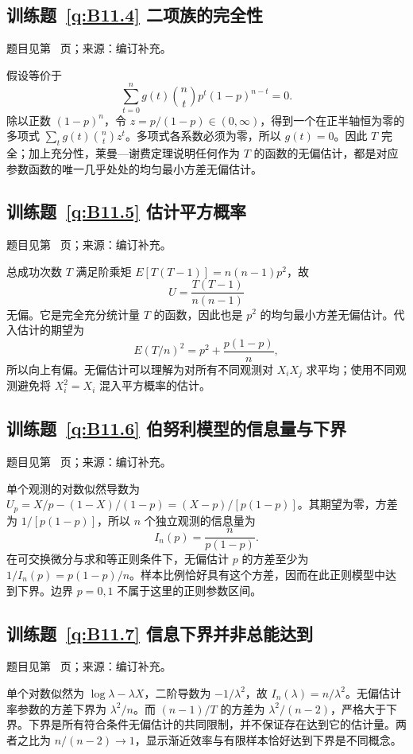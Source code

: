 \subsection*{训练题~\ref{q:B11.4} 二项族的完全性}\label{a:B11.4}{\small 题目见第~\pageref{q:B11.4} 页；来源：编订补充。}
\begin{solve}假设等价于\[\sum_{t=0}^ng(t)\binom nt p^t(1-p)^{n-t}=0.\]除以正数 $(1-p)^n$，令 $z=p/(1-p)\in(0,\infty)$，得到一个在正半轴恒为零的多项式 $\sum_tg(t)\binom ntz^t$。多项式各系数必须为零，所以 $g(t)=0$。因此 $T$ 完全；加上充分性，莱曼—谢费定理说明任何作为 $T$ 的函数的无偏估计，都是对应参数函数的唯一几乎处处的均匀最小方差无偏估计。\end{solve}

\subsection*{训练题~\ref{q:B11.5} 估计平方概率}\label{a:B11.5}{\small 题目见第~\pageref{q:B11.5} 页；来源：编订补充。}
\begin{solve}总成功次数 $T$ 满足阶乘矩 $E[T(T-1)]=n(n-1)p^2$，故\[U=\frac{T(T-1)}{n(n-1)}\]无偏。它是完全充分统计量 $T$ 的函数，因此也是 $p^2$ 的均匀最小方差无偏估计。代入估计的期望为\[E(T/n)^2=p^2+\frac{p(1-p)}n,\]所以向上有偏。无偏估计可以理解为对所有不同观测对 $X_iX_j$ 求平均；使用不同观测避免将 $X_i^2=X_i$ 混入平方概率的估计。\end{solve}

\subsection*{训练题~\ref{q:B11.6} 伯努利模型的信息量与下界}\label{a:B11.6}{\small 题目见第~\pageref{q:B11.6} 页；来源：编订补充。}
\begin{solve}单个观测的对数似然导数为 $U_p=X/p-(1-X)/(1-p)=(X-p)/[p(1-p)]$。其期望为零，方差为 $1/[p(1-p)]$，所以 $n$ 个独立观测的信息量为\[I_n(p)=\frac{n}{p(1-p)}.\]在可交换微分与求和等正则条件下，无偏估计 $p$ 的方差至少为 $1/I_n(p)=p(1-p)/n$。样本比例恰好具有这个方差，因而在此正则模型中达到下界。边界 $p=0,1$ 不属于这里的正则参数区间。\end{solve}

\subsection*{训练题~\ref{q:B11.7} 信息下界并非总能达到}\label{a:B11.7}{\small 题目见第~\pageref{q:B11.7} 页；来源：编订补充。}
\begin{solve}单个对数似然为 $\log\lambda-\lambda X$，二阶导数为 $-1/\lambda^2$，故 $I_n(\lambda)=n/\lambda^2$。无偏估计率参数的方差下界为 $\lambda^2/n$。而 $(n-1)/T$ 的方差为 $\lambda^2/(n-2)$，严格大于下界。下界是所有符合条件无偏估计的共同限制，并不保证存在达到它的估计量。两者之比为 $n/(n-2)\to1$，显示渐近效率与有限样本恰好达到下界是不同概念。\end{solve}

